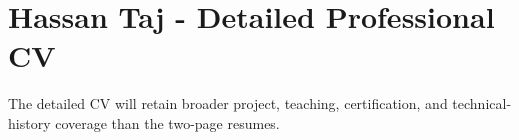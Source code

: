 \documentclass[11pt,a4paper]{article}
\begin{document}
\section*{Hassan Taj - Detailed Professional CV}
The detailed CV will retain broader project, teaching, certification, and technical-history coverage than the two-page resumes.
\end{document}
